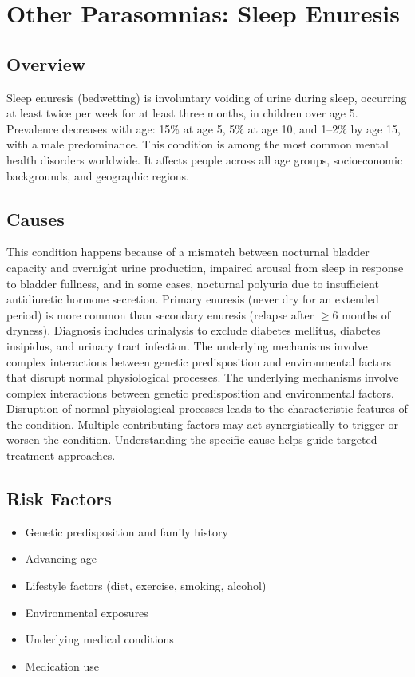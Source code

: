 \chapter{Other Parasomnias: Sleep Enuresis}
\label{sec:Sleep Enuresis}

\section{Overview}
Sleep enuresis (bedwetting) is involuntary voiding of urine during sleep, occurring at least twice per week for at least three months, in children over age 5. Prevalence decreases with age: 15\% at age 5, 5\% at age 10, and 1--2\% by age 15, with a male predominance. This condition is among the most common mental health disorders worldwide. It affects people across all age groups, socioeconomic backgrounds, and geographic regions.
\section{Causes}
This condition happens because of a mismatch between nocturnal bladder capacity and overnight urine production, impaired arousal from sleep in response to bladder fullness, and in some cases, nocturnal polyuria due to insufficient antidiuretic hormone secretion. Primary enuresis (never dry for an extended period) is more common than secondary enuresis (relapse after $\ge$6 months of dryness). Diagnosis includes urinalysis to exclude diabetes mellitus, diabetes insipidus, and urinary tract infection. The underlying mechanisms involve complex interactions between genetic predisposition and environmental factors that disrupt normal physiological processes. The underlying mechanisms involve complex interactions between genetic predisposition and environmental factors. Disruption of normal physiological processes leads to the characteristic features of the condition. Multiple contributing factors may act synergistically to trigger or worsen the condition. Understanding the specific cause helps guide targeted treatment approaches.
\section{Risk Factors}


\begin{itemize}[noitemsep]
  \item Genetic predisposition and family history
  \item Advancing age
  \item Lifestyle factors (diet, exercise, smoking, alcohol)
  \item Environmental exposures
  \item Underlying medical conditions
  \item Medication use
\end{itemize}
